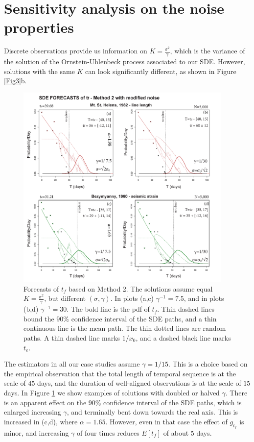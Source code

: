 \documentclass{article}
\begin{document}
\section{Sensitivity analysis on the noise properties}\label{A-2}
Discrete observations provide us information on $K=\frac{\sigma^2}{\gamma}$, which is the variance of the solution of the Ornstein-Uhlenbeck process associated to our SDE. However, solutions with the same $K$ can look significantly different, as shown in Figure \ref{Fig3}b.
\begin{figure}[H]
\centering
\includegraphics[width=0.95\textwidth]{Fig12_plus.png}
\caption{Forecasts of $t_f$ based on Method 2. The solutions assume equal $K=\frac{\sigma^2}{\gamma}$, but different $(\sigma, \gamma)$. In plots (a,c) $\gamma^{-1}=7.5$, and in plots (b,d) $\gamma^{-1}=30$. The bold line is the pdf of $t_f$. Thin dashed lines bound the $90\%$ confidence interval of the SDE paths, and a thin continuous line is the mean path. The thin dotted lines are random paths. A thin dashed line marks $1/x_0$, and a dashed black line marks $t_e$.}
\label{Fig12}
\end{figure}
The estimators in all our case studies assume $\gamma=1/15$.  This is a choice based on the empirical observation that the total length of temporal sequence is at the scale of $45$ days, and the duration of well-aligned observations is at the scale of $15$ days. In Figure \ref{Fig12} we show examples of solutions with doubled or halved $\gamma$. There is an apparent effect on the $90\%$ confidence interval of the SDE paths, which is enlarged increasing $\gamma$, and terminally bent down towards the real axis. This is increased in (c,d), where $\alpha=1.65$. However, even in that case the effect of $g_{t_f}$ is minor, and increasing $\gamma$ of four times reduces $E[t_f]$ of about $5$ days.
\end{document}
